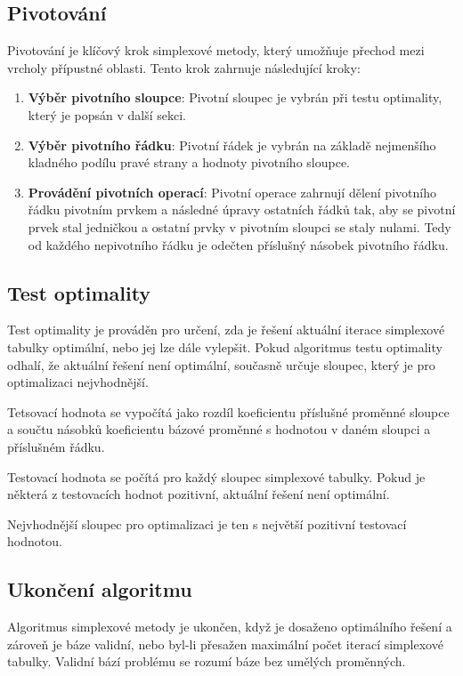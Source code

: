 \documentclass[czech, sem, kiv, he, pdf, viewonly]{fasthesis}
\begin{document}
\subsection{Pivotování}

Pivotování je klíčový krok simplexové metody, který umožňuje přechod mezi vrcholy přípustné oblasti. Tento krok zahrnuje následující kroky:
\begin{enumerate}
    \item \textbf{Výběr pivotního sloupce}: Pivotní sloupec je vybrán při testu optimality, který je popsán v další sekci.
    \item \textbf{Výběr pivotního řádku}: Pivotní řádek je vybrán na základě nejmenšího kladného podílu pravé strany a hodnoty pivotního sloupce.
    \item \textbf{Provádění pivotních operací}: Pivotní operace zahrnují dělení pivotního řádku pivotním prvkem a následné úpravy ostatních řádků tak, aby se pivotní prvek stal jedničkou a ostatní prvky v pivotním sloupci se staly nulami. Tedy od každého nepivotního řádku je odečten příslušný násobek pivotního řádku. 
\end{enumerate}

\subsection{Test optimality}

Test optimality je prováděn pro určení, zda je řešení aktuální iterace simplexové tabulky optimální, nebo jej lze dále vylepšit. Pokud algoritmus testu optimality odhalí, že aktuální řešení není optimální, současně určuje sloupec, který je pro optimalizaci nejvhodnější.

Tetsovací hodnota se vypočítá jako rozdíl koeficientu příslušné proměnné sloupce a součtu násobků koeficientu bázové proměnné s hodnotou v daném sloupci a příslušném řádku.

Testovací hodnota se počítá pro každý sloupec simplexové tabulky.
Pokud je některá z testovacích hodnot pozitivní, aktuální řešení není optimální.

Nejvhodnější sloupec pro optimalizaci je ten s největší pozitivní testovací hodnotou.

\subsection{Ukončení algoritmu}

Algoritmus simplexové metody je ukončen, když je dosaženo optimálního řešení a zároveň je báze validní, nebo byl-li přesažen maximální počet iterací simplexové tabulky. Validní bází problému se rozumí báze bez umělých proměnných.
\end{document}
